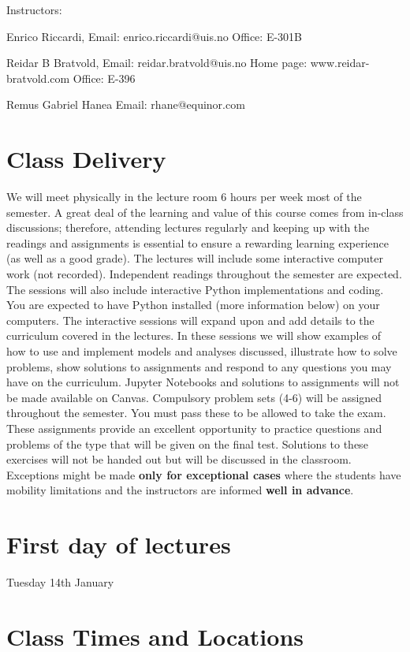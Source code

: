\documentclass[letterpaper,12pt,oneside]{article}
\begin{document}
Instructors:

Enrico Riccardi,
Email: enrico.riccardi@uis.no
Office: E-301B

Reidar B Bratvold,
Email: reidar.bratvold@uis.no
Home page: www.reidar-bratvold.com
Office: E-396 

Remus Gabriel Hanea 
Email: rhane@equinor.com 


\section*{Class Delivery}


We will meet physically in the lecture room 6 hours per week most of the semester. A
great deal of the learning and value of this course comes from in-class discussions;
therefore, attending lectures regularly and keeping up with the readings and assignments
is essential to ensure a rewarding learning experience (as well as a good grade).
The lectures will include some interactive computer work (not recorded). Independent readings
throughout the semester are expected.
The sessions will also include interactive Python implementations and coding. You are
expected to have Python installed (more information below) on your computers.
The interactive sessions will expand upon and add details to the curriculum covered in
the lectures. In these sessions we will show examples of how to use and implement
models and analyses discussed, illustrate how to solve problems, show solutions to
assignments and respond to any questions you may have on the curriculum. Jupyter
Notebooks and solutions to assignments will not be made available on
Canvas.
Compulsory problem sets (4-6) will be assigned throughout the semester. You must pass
these to be allowed to take the exam. These assignments provide an excellent opportunity to practice
questions and problems of the type that will be given on the final test. Solutions to these
exercises will not be handed out but will be discussed in the classroom. Exceptions might be made \textbf{only for exceptional cases} where the students have mobility limitations and the instructors are informed \textbf{well in advance}.


\section*{First day of lectures}

Tuesday 14th January


\section*{Class Times and Locations}
  
\end{document}
